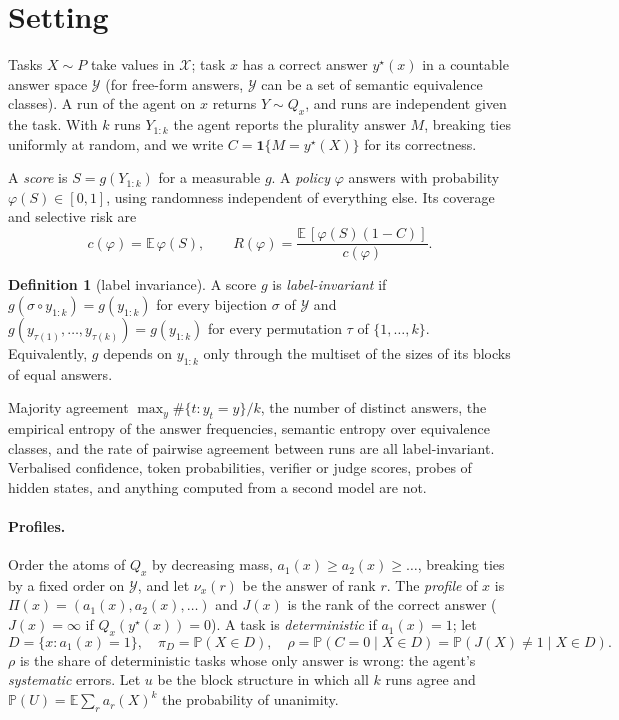 \documentclass[11pt]{article}
\theoremstyle{definition}
\newtheorem{definition}{Definition}
\newcommand{\E}{\mathbb{E}}
\renewcommand{\P}{\mathbb{P}}
\newcommand{\ind}{\mathbf{1}}
\newcommand{\Y}{\mathcal{Y}}
\newcommand{\X}{\mathcal{X}}
\begin{document}
\section{Setting}\label{sec:setting}

Tasks $X\sim P$ take values in $\X$; task $x$ has a correct answer $y^\star(x)$ in a countable
answer space $\Y$ (for free-form answers, $\Y$ can be a set of semantic equivalence classes). A run
of the agent on $x$ returns $Y\sim Q_x$, and runs are independent given the task. With $k$ runs
$Y_{1:k}$ the agent reports the plurality answer $M$, breaking ties uniformly at random, and we
write $C=\ind\{M=y^\star(X)\}$ for its correctness.

A \emph{score} is $S=g(Y_{1:k})$ for a measurable $g$. A \emph{policy} $\varphi$ answers with
probability $\varphi(S)\in[0,1]$, using randomness independent of everything else. Its coverage and
selective risk are
\[
c(\varphi)=\E\,\varphi(S),\qquad
R(\varphi)=\frac{\E\,[\varphi(S)(1-C)]}{c(\varphi)}.
\]

\begin{definition}[label invariance]
A score $g$ is \emph{label-invariant} if $g(\sigma\circ y_{1:k})=g(y_{1:k})$ for every bijection
$\sigma$ of $\Y$ and $g(y_{\tau(1)},\dots,y_{\tau(k)})=g(y_{1:k})$ for every permutation $\tau$ of
$\{1,\dots,k\}$. Equivalently, $g$ depends on $y_{1:k}$ only through the multiset of the sizes of
its blocks of equal answers.
\end{definition}

Majority agreement $\max_y \#\{t:y_t=y\}/k$, the number of distinct answers, the empirical
entropy of the answer frequencies, semantic entropy over equivalence classes, and the rate of
pairwise agreement between runs are all label-invariant. Verbalised confidence, token
probabilities, verifier or judge scores, probes of hidden states, and anything computed from a
second model are not.

\paragraph{Profiles.} Order the atoms of $Q_x$ by decreasing mass,
$a_1(x)\ge a_2(x)\ge\dots$, breaking ties by a fixed order on $\Y$, and let $\nu_x(r)$ be the answer
of rank $r$. The \emph{profile} of $x$ is $\Pi(x)=(a_1(x),a_2(x),\dots)$ and $J(x)$ is the rank of the
correct answer ($J(x)=\infty$ if $Q_x(y^\star(x))=0$). A task is \emph{deterministic} if $a_1(x)=1$; let
\[
D=\{x:a_1(x)=1\},\quad \pi_D=\P(X\in D),\quad \rho=\P(C=0\mid X\in D)=\P(J(X)\neq 1\mid X\in D).
\]
$\rho$ is the share of deterministic tasks whose only answer is wrong: the agent's
\emph{systematic} errors. Let $u$ be the block structure in which all $k$ runs agree and
$\P(U)=\E\sum_r a_r(X)^k$ the probability of unanimity.
\end{document}
